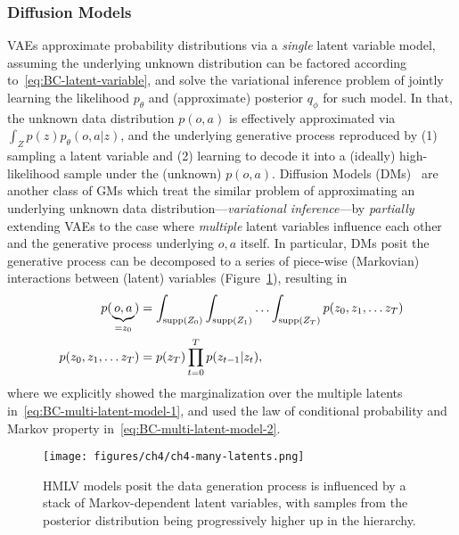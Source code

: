 \subsubsection{Diffusion Models}
VAEs approximate probability distributions via a \emph{single} latent variable model, assuming the underlying unknown distribution can be factored according to~\ref{eq:BC-latent-variable}, and solve the variational inference problem of jointly learning the likelihood \( p_\theta \) and (approximate) posterior \( q_\phi \) for such model.
In that, the unknown data distribution \( p(o,a) \) is effectively approximated via \( \int_Z p(z) p_\theta(o,a \vert z) \), and the underlying generative process reproduced by (1) sampling a latent variable and (2) learning to decode it into a (ideally) high-likelihood sample under the (unknown) \( p(o,a) \).
Diffusion Models (DMs)~\citep{hoDenoisingDiffusionProbabilistic2020} are another class of GMs which treat the similar problem of approximating an underlying unknown data distribution---\emph{variational inference}---by \emph{partially} extending VAEs to the case where \emph{multiple} latent variables influence each other and the generative process underlying \(o,a\) itself.
In particular, DMs posit the generative process can be decomposed to a series of piece-wise (Markovian) interactions between (latent) variables (Figure~\ref{fig:ch4-many-latents}), resulting in
\begin{align}
    p(\underbrace{o,a}_{= z_0}) &= \int_{\text{supp}({Z_0})} \int_{\text{supp}({Z_1})} \hdots \int_{\text{supp}({Z_T})} p(z_0, z_1, \dots z_T) \label{eq:BC-multi-latent-model-1} \\ 
    p(z_0, z_1, \dots z_T) &= p(z_T) \prod_{t=0}^{T} p(z_{t-1} \vert z_t), \label{eq:BC-multi-latent-model-2}
\end{align}
where we explicitly showed the marginalization over the multiple latents in~\ref{eq:BC-multi-latent-model-1}, and used the law of conditional probability and Markov property in~\ref{eq:BC-multi-latent-model-2}.

\begin{figure}
    \centering
    \texttt{[image: figures/ch4/ch4-many-latents.png]}
    \caption{HMLV models posit the data generation process is influenced by a stack of Markov-dependent latent variables, with samples from the posterior distribution being progressively higher up in the hierarchy.}
    \label{fig:ch4-many-latents}
\end{figure}

